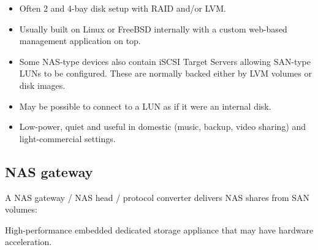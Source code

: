 \documentclass[slides]{pgnotes}
\begin{document}
\begin{itemize}
\item
  Often 2 and 4-bay disk setup with RAID and/or LVM.
\item
  Usually built on Linux or FreeBSD internally with a custom web-based
  management application on top.
\item
  Some NAS-type devices also contain iSCSI Target Servers allowing
  SAN-type LUNs to be configured. These are normally backed either by
  LVM volumes or disk images.
\item
  May be possible to connect to a LUN as if it were an internal disk.
\item
  Low-power, quiet and useful in domestic (music, backup, video sharing)
  and light-commercial settings.
\end{itemize}

\subsection{NAS gateway}
\label{sec:nas-gateway}

A NAS gateway / NAS head / protocol converter delivers NAS shares from
SAN volumes:

High-performance embedded dedicated storage appliance that
may have hardware acceleration.

\end{document}
